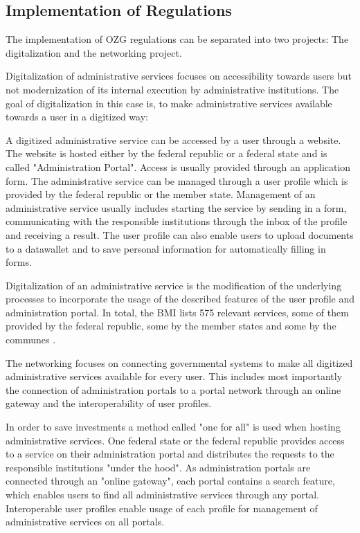 \subsection{Implementation of Regulations}

The implementation of OZG regulations can be separated into two projects: The digitalization and the networking project.

Digitalization of administrative services focuses on accessibility towards users but not modernization of its internal execution by administrative institutions. The goal of digitalization in this case is, to make administrative services available towards a user in a digitized way:

A digitized administrative service can be accessed by a user through a website. The website is hosted either by the federal republic or a federal state and is called "Administration Portal". Access is usually provided through an application form. The administrative service can be managed through a user profile which is provided by the federal republic or the member state. Management of an administrative service usually includes starting the service by sending in a form, communicating with the responsible institutions through the inbox of the profile and receiving a result. The user profile can also enable users to upload documents to a datawallet and to save personal information for automatically filling in forms.

Digitalization of an administrative service is the modification of the underlying processes to incorporate the usage of the described features of the user profile and administration portal. In total, the BMI lists 575 relevant services, some of them provided by the federal republic, some by the member states and some by the communes \cite{BMI:Onlinezugangsgesetz}.

The networking focuses on connecting governmental systems to make all digitized administrative services available for every user. This includes most importantly the connection of administration portals to a portal network through an online gateway and the interoperability of user profiles.

In order to save investments a method called "one for all" is used when hosting administrative services. One federal state or the federal republic provides access to a service on their administration portal and distributes the requests to the responsible institutions "under the hood". As administration portals are connected through an "online gateway", each portal contains a search feature, which enables users to find all administrative services through any portal. Interoperable user profiles enable usage of each profile for management of administrative services on all portals.

